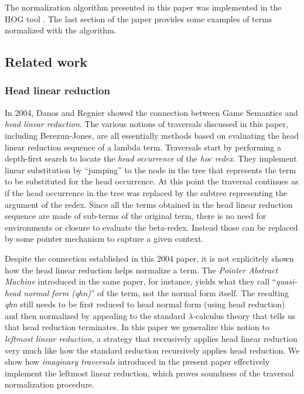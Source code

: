 \documentclass{article}
\theoremstyle{definition}
\begin{document}
The normalization algorithm presented in this paper was implemented in the HOG tool \cite{Blum-HogTool}. The last section of the paper provides some examples of terms normalized with the algorithm.

\subsection{Related work}

\subsubsection{Head linear reduction}
In 2004, Danos and Regnier showed the connection between Game Semantics and \emph{head linear reduction}. The various notions of traversals discussed in this paper, including Berezun-Jones, are all essentially methods based on evaluating the head linear reduction sequence of a lambda term. Traversals start by performing a depth-first search to locate the \emph{head occurrence} of the \emph{hoc redex}. They implement linear substitution by ``jumping'' to the node in the tree that represents the term to be substituted for the head occurrence. At this point the traversal continues as if the head occurrence in the tree was replaced by the subtree representing the argument of the redex. Since all the terms obtained in the head linear reduction sequence are made of sub-terms of the original term, there is no need for environments or closure to evaluate the beta-redex. Instead those can be replaced by some pointer mechanism to capture a given context.

Despite the connection established in this 2004 paper, it is not explicitely shown how the head linear reduction helps normalize a term. The \emph{Pointer Abstract Machine} introduced in the same paper, for instance, yields what they call ``\emph{quasi-head normal form (qhn)}'' of the term, not the normal form itself. The resulting \emph{qhn} still needs to be first reduced to head normal form (using head reduction) and then normalized by appealing to the standard $\lambda$-calculus theory that tells us that head reduction terminates.
In this paper we generalize this notion to \emph{leftmost linear reduction}, a strategy that recrusively applies head linear reduction very much like how the standard reduction recursively applies head reduction. We show how \emph{imaginary traversals} introduced in the present paper effectively implement the leftmost linear reduction, which proves soundness of the traversal normalization procedure.
\end{document}
